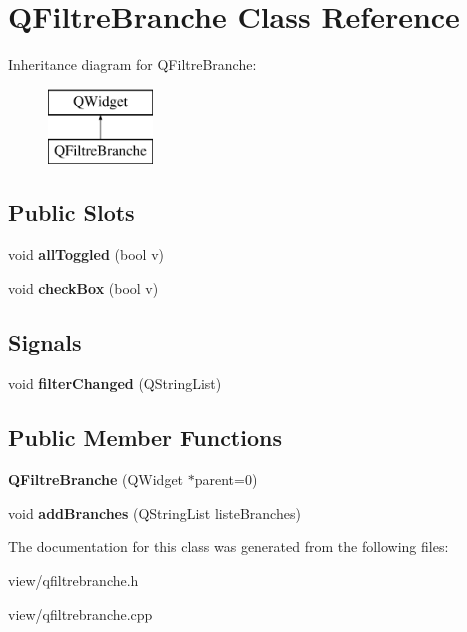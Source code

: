 \hypertarget{classQFiltreBranche}{\section{Q\+Filtre\+Branche Class Reference}
\label{classQFiltreBranche}
}
Inheritance diagram for Q\+Filtre\+Branche\+:\begin{figure}[H]
\begin{center}
\leavevmode
\includegraphics[height=2.000000cm]{classQFiltreBranche}
\end{center}
\end{figure}
\subsection*{Public Slots}
\begin{DoxyCompactItemize}
\item 
\hypertarget{classQFiltreBranche_a26b7d1d502beded039d21490a7767c21}{void {\bfseries all\+Toggled} (bool v)}\label{classQFiltreBranche_a26b7d1d502beded039d21490a7767c21}

\item 
\hypertarget{classQFiltreBranche_a03494ad495b4f96475b9ce0241ce8ecc}{void {\bfseries check\+Box} (bool v)}\label{classQFiltreBranche_a03494ad495b4f96475b9ce0241ce8ecc}

\end{DoxyCompactItemize}
\subsection*{Signals}
\begin{DoxyCompactItemize}
\item 
\hypertarget{classQFiltreBranche_aab3bc72e3317c77916c15039368c2249}{void {\bfseries filter\+Changed} (Q\+String\+List)}\label{classQFiltreBranche_aab3bc72e3317c77916c15039368c2249}

\end{DoxyCompactItemize}
\subsection*{Public Member Functions}
\begin{DoxyCompactItemize}
\item 
\hypertarget{classQFiltreBranche_a9d4428348ef3056d052a93681d489c6d}{{\bfseries Q\+Filtre\+Branche} (Q\+Widget $\ast$parent=0)}\label{classQFiltreBranche_a9d4428348ef3056d052a93681d489c6d}

\item 
\hypertarget{classQFiltreBranche_a1c845f09ab958e4d138c0e856f2569dd}{void {\bfseries add\+Branches} (Q\+String\+List liste\+Branches)}\label{classQFiltreBranche_a1c845f09ab958e4d138c0e856f2569dd}

\end{DoxyCompactItemize}


The documentation for this class was generated from the following files\+:\begin{DoxyCompactItemize}
\item 
view/qfiltrebranche.\+h\item 
view/qfiltrebranche.\+cpp\end{DoxyCompactItemize}

